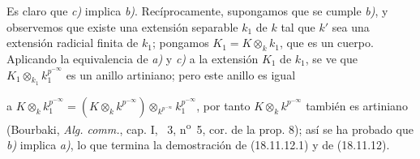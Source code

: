 Es claro que \emph{c)} implica \emph{b)}. Recíprocamente, supongamos que se cumple \emph{b)}, y observemos que existe una extensión separable $k_1$ de $k$ tal que $k'$ sea una extensión radicial finita de $k_1$; pongamos $K_1=K\otimes_k k_1$, que es un cuerpo. Aplicando la equivalencia de \emph{a)} y \emph{c)} a la extensión $K_1$ de $k_1$, se ve que $K_1\otimes_{k_1}k_1^{p^{-\infty}}$ es un anillo artiniano; pero este anillo es igual


a
$K\otimes_k k_1^{p^{-\infty}}=(K\otimes_k k^{p^{-\infty}})\otimes_{k^{p^{-\infty}}}k_1^{p^{-\infty}}$,
por tanto $K\otimes_k k^{p^{-\infty}}$ también es artiniano (Bourbaki, \emph{Alg. comm.}, cap. I, \textsection~3, n\textsuperscript{o}~5, cor. de la prop. 8); así se ha probado que \emph{b)} implica \emph{a)}, lo que termina la demostración de (18.11.12.1) y de (18.11.12).
